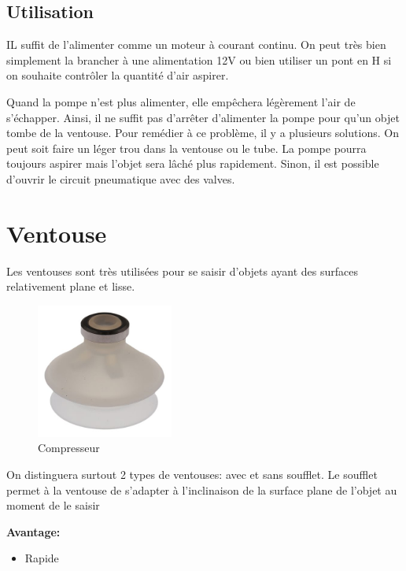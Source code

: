 \documentclass[a4paper, 11pt]{report}
\begin{document}
\subsection{Utilisation}
IL suffit de l'alimenter comme un moteur à courant continu. On peut très bien simplement la brancher à une alimentation 12V ou bien utiliser un pont en H si on souhaite contrôler la quantité d'air aspirer. 

Quand la pompe n'est plus alimenter, elle empêchera légèrement l'air de s'échapper. Ainsi, il ne suffit pas d'arrêter d'alimenter la pompe pour qu'un objet tombe de la ventouse. Pour remédier à ce problème, il y a plusieurs solutions. On peut soit faire un léger trou dans la ventouse ou le tube. La pompe pourra toujours aspirer mais l'objet sera lâché plus rapidement. Sinon, il est possible d'ouvrir le circuit pneumatique avec des valves.

\section{Ventouse}
Les ventouses sont très utilisées pour se saisir d'objets ayant des surfaces relativement plane et lisse.

\begin{figure}
\begin{centering}
\includegraphics[width=0.4\textwidth]{images/ventouseSoufflet.jpg}
\caption{Compresseur}
\par\end{centering}
\end{figure}

On distinguera surtout 2 types de ventouses: avec et sans soufflet. Le soufflet permet à la ventouse de s'adapter à l'inclinaison de la surface plane de l'objet au moment de le saisir

\textbf{Avantage:}
\begin{itemize}
\item Rapide
\end{itemize}
\end{document}
